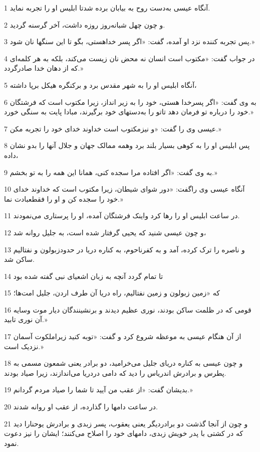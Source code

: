 \par 1 آنگاه عیسی به‌دست روح به بیابان برده شدتا ابلیس او را تجربه نماید.
\par 2 و چون چهل شبانه‌روز روزه داشت، آخر گرسنه گردید.
\par 3 پس تجربه کننده نزد او آمده، گفت: «اگر پسر خداهستی، بگو تا این سنگها نان شود.»
\par 4 در جواب گفت: «مکتوب است انسان نه محض نان زیست می‌کند، بلکه به هر کلمه‌ای که از دهان خدا صادرگردد.»
\par 5 آنگاه ابلیس او را به شهر مقدس برد و برکنگره هیکل برپا داشته،
\par 6 به وی گفت: «اگر پسرخدا هستی، خود را به زیر انداز، زیرا مکتوب است که فرشتگان خود را درباره تو فرمان دهد تاتو را به‌دستهای خود برگیرند، مبادا پایت به سنگی خورد.»
\par 7 عیسی وی را گفت: «و نیزمکتوب است خداوند خدای خود را تجربه مکن.»
\par 8 پس ابلیس او را به کوهی بسیار بلند برد وهمه ممالک جهان و جلال آنها را بدو نشان داده،
\par 9 به وی گفت: «اگر افتاده مرا سجده کنی، همانا این همه را به تو بخشم.»
\par 10 آنگاه عیسی وی راگفت: «دور شو‌ای شیطان، زیرا مکتوب است که خداوند خدای خود را سجده کن و او را فقطعبادت نما.»
\par 11 در ساعت ابلیس او را رها کرد واینک فرشتگان آمده، او را پرستاری می‌نمودند.
\par 12 و چون عیسی شنید که یحیی گرفتار شده است، به جلیل روانه شد،
\par 13 و ناصره را ترک کرده، آمد و به کفرناحوم، به کناره دریا در حدودزبولون و نفتالیم ساکن شد.
\par 14 تا تمام گردد آنچه به زبان اشعیای نبی گفته شده بود
\par 15 که «زمین زبولون و زمین نفتالیم، راه دریا آن طرف اردن، جلیل امت‌ها؛
\par 16 قومی که در ظلمت ساکن بودند، نوری عظیم دیدند و برنشینندگان دیار موت وسایه آن نوری تابید.»
\par 17 از آن هنگام عیسی به موعظه شروع کرد و گفت: «توبه کنید زیراملکوت آسمان نزدیک است.»
\par 18 و چون عیسی به کناره دریای جلیل می‌خرامید، دو برادر یعنی شمعون مسمی به پطرس و برادرش اندریاس را دید که دامی دردریا می‌اندازند، زیرا صیاد بودند.
\par 19 بدیشان گفت: «از عقب من آیید تا شما را صیاد مردم گردانم.»
\par 20 در ساعت دامها را گذارده، از عقب او روانه شدند.
\par 21 و چون از آنجا گذشت دو برادردیگر یعنی یعقوب، پسر زبدی و برادرش یوحنارا دید که در کشتی با پدر خویش زبدی، دامهای خود را اصلاح می‌کنند؛ ایشان را نیز دعوت نمود.
